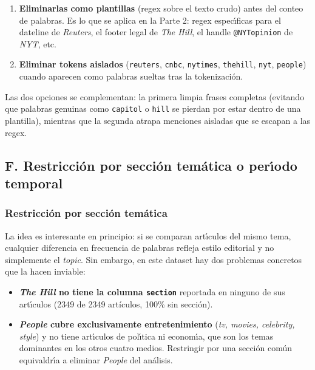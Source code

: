 \documentclass[11pt,a4paper]{article}
\begin{document}
\begin{enumerate}
    \item \textbf{Eliminarlas como plantillas} (regex sobre el texto crudo) antes del conteo de palabras. Es lo que se aplica en la Parte 2: regex espec\'{\i}ficas para el dateline de \textit{Reuters}, el footer legal de \textit{The Hill}, el handle \texttt{@NYTopinion} de \textit{NYT}, etc.
    \item \textbf{Eliminar tokens aislados} (\texttt{reuters}, \texttt{cnbc}, \texttt{nytimes}, \texttt{thehill}, \texttt{nyt}, \texttt{people}) cuando aparecen como palabras sueltas tras la tokenizaci\'{o}n.
\end{enumerate}

Las dos opciones se complementan: la primera limpia frases completas (evitando que palabras genuinas como \texttt{capitol} o \texttt{hill} se pierdan por estar dentro de una plantilla), mientras que la segunda atrapa menciones aisladas que se escapan a las regex.


\subsection{F. Restricci\'{o}n por secci\'{o}n tem\'{a}tica o per\'{\i}odo temporal}

\subsubsection*{Restricci\'{o}n por secci\'{o}n tem\'{a}tica}

La idea es interesante en principio: si se comparan art\'{\i}culos del mismo tema, cualquier diferencia en frecuencia de palabras refleja estilo editorial y no simplemente el \textit{topic}. Sin embargo, en este dataset hay dos problemas concretos que la hacen inviable:

\begin{itemize}
    \item \textbf{\textit{The Hill} no tiene la columna \texttt{section}} reportada en ninguno de sus art\'{\i}culos (2349 de 2349 art\'iculos, 100\% sin secci\'on).
    \item \textbf{\textit{People} cubre exclusivamente entretenimiento} (\textit{tv, movies, celebrity, style}) y no tiene art\'{\i}culos de pol\'{\i}tica ni econom\'{\i}a, que son los temas dominantes en los otros cuatro medios. Restringir por una secci\'{o}n com\'{u}n equivaldr\'{\i}a a eliminar \textit{People} del an\'{a}lisis.
\end{itemize}
\end{document}
